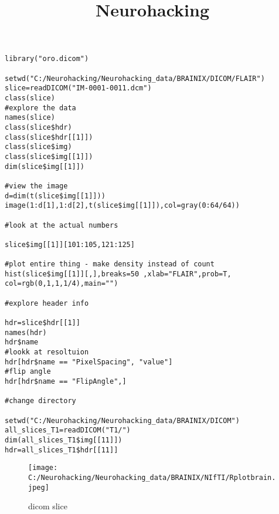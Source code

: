 \documentclass[]{article}
\title{Neurohacking}
\author{}
\date{}
\begin{document}
\maketitle

\begin{verbatim}
library("oro.dicom")

setwd("C:/Neurohacking/Neurohacking_data/BRAINIX/DICOM/FLAIR")
slice=readDICOM("IM-0001-0011.dcm")
class(slice)
#explore the data
names(slice)
class(slice$hdr)
class(slice$hdr[[1]])
class(slice$img)
class(slice$img[[1]])
dim(slice$img[[1]])

#view the image
d=dim(t(slice$img[[1]]))
image(1:d[1],1:d[2],t(slice$img[[1]]),col=gray(0:64/64))

#look at the actual numbers

slice$img[[1]][101:105,121:125]

#plot entire thing - make density instead of count
hist(slice$img[[1]][,],breaks=50 ,xlab="FLAIR",prob=T, col=rgb(0,1,1,1/4),main="")

#explore header info

hdr=slice$hdr[[1]]
names(hdr)
hdr$name
#lookk at resoltuion
hdr[hdr$name == "PixelSpacing", "value"]
#flip angle
hdr[hdr$name == "FlipAngle",]

#change directory

setwd("C:/Neurohacking/Neurohacking_data/BRAINIX/DICOM")
all_slices_T1=readDICOM("T1/")
dim(all_slices_T1$img[[11]])
hdr=all_slices_T1$hdr[[11]]
\end{verbatim}

\begin{figure}
\centering
\texttt{[image: C:/Neurohacking/Neurohacking\_data/BRAINIX/NIfTI/Rplotbrain.jpeg]}
\caption{dicom slice}
\end{figure}
\end{document}
